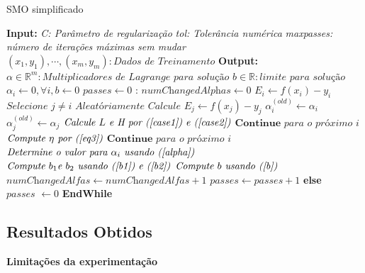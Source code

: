\documentclass{article}
\begin{document}
\begin{algorithm}[H]
\caption{SMO simplificado}\label{euclid}
\begin{algorithmic}[1]
\State \textbf{Input: }
\State \textit{C: Parâmetro de regularização}
\State \textit{tol: Tolerância numérica}
\State \textit{maxpasses: número de iterações máximas sem mudar}
\State $(x_1,y_1),\cdots,(x_m,y_m): \textit{Dados de Treinamento}$
\State
\State \textbf{Output: }
\State $\alpha\in\mathbb{R}^m:\textit{Multiplicadores de Lagrange para solução}$
\State $ b\in\mathbb{R}: \textit{limite para solução}$
\State
{}
\State $ \alpha_i\gets0,\forall i,b\gets0$
\State $\textit{passes}\gets0$
:
    \State $\textit{numChangedAlphas}\gets 0$
        \State $E_i\gets f(x_i)-y_i$
            \State $\textit{Selecione } j\neq i \textit{ Aleatóriamente}$
            \State $\textit{Calcule } E_j\gets f(x_j)-y_j$
            \State $\alpha_{i}^{(old)}\gets\alpha_i$
            \State $\alpha_{j}^{(old)}\gets\alpha_j$
            \State $\textit{Calcule }L\textit{ e H por (\ref{case1}) e (\ref{case2})}$
                \State $\textbf{Continue }\textit{para o próximo }i$
            \EndIf
            \State $\textit{Compute } \eta \textit{ por (\ref{eq3})}$
                \State $\textbf{Continue }\textit{para o próximo }i$
            \EndIf
            \State $\textit{Determine o valor para }\alpha_i\textit{ usando (\ref{alpha})}$
            \State $\textit{Compute }b_1 \textit{e }b_2\textit{ usando (\ref{b1}) e (\ref{b2})}$
            \State$\textit{Compute }b\textit{ usando (\ref{b})}$
            \State $\textit{numChangedAlfas}\gets\textit{numChangedAlfas}+1$
        \EndIf
    \EndFor
        \State $\textit{passes}\gets\textit{passes}+1$
    \EndIf
    \State\textbf{else}
        \State$\textit{passes }\gets0$
\EndWhile
\State\textbf{EndWhile}
\EndProcedure
\end{algorithmic}
\end{algorithm}

\subsection{Resultados Obtidos}

\textbf{Limitações da experimentação}
\end{document}
